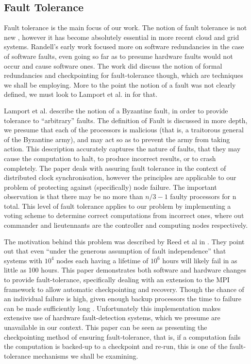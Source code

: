 \subsection*{Fault Tolerance}

Fault tolerance is the main focus of our work.
The notion of fault tolerance is not new \cite{ran75}, however it has become absolutely essential in more recent cloud and grid systems.
Randell's early work focused more on software redundancies in the case of software faults, even going so far as to presume hardware faults would not occur and cause software ones.
The work did discuss the notion of formal redundancies and checkpointing for fault-tolerance though, which are techniques we shall be employing.
More to the point the notion of a fault was not clearly defined, we must look to Lamport et al. in \cite{lam86} for that.

Lamport et al. describe the notion of a Byzantine fault, in order to provide tolerance to ``arbitrary'' faults.
The definition of Fault is discussed in more depth, we presume that each of the processors is malicious (that is, a traitorous general of the Byzantine army), and may act so as to prevent the army from taking action.
This description accurately captures the nature of faults, that they may cause the computation to halt, to produce incorrect results, or to crash completely.
The paper deals with assuring fault tolerance in the context of distributed clock synchronisation, however the principles are applicable to our problem of protecting against (specifically) node failure.
The important observation is that there may be no more than $n/3 - 1$ faulty processors for n total.
This level of fault tolerance applies to our problem by implementing a voting scheme \cite{lam86} to determine correct computations from incorrect ones, where out commander and lieutennants are the controller and computing nodes respectively.

The motivation behind this problem was described by Reed et al in \cite{ree06}.
They point out that even ``under the generous assumption of fault independence'' that systems with $10^4$ nodes each having a lifetime of $10^6$ hours will likely fail in as little as 100 hours.
This paper demonstrates both software and hardware changes to provide fault-tolerance, specifically dealing with an extension to the MPI framework to allow automatic checkpointing and recovery.
Though the chance of an individual failure is high, given enough backup processors the time to failure can be made sufficiently long \cite{ree06}.
Unfortunately this implementation makes extensive use of hardware fault-detection systems, which we presume are unavailable in our context.
This paper can be seen as presenting the checkpointing method of ensuring fault-tolerance, that is, if a computation fails the computation is backed-up to a checkpoint and re-run, this is one of the fault-tolerance mechanisms we shall be examining.

